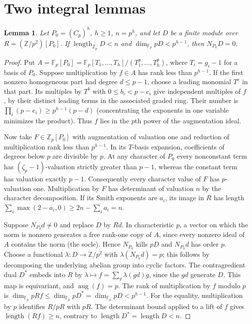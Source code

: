 \documentclass[11pt]{article}
\newtheorem{lemma}[theorem]{Lemma}
\newcommand{\Z}{\mathbb Z}
\newcommand{\F}{\mathbb F}
\newcommand{\aug}{\operatorname{aug}}
\newcommand{\len}{\operatorname{length}}
\begin{document}
\section{Two integral lemmas}
\begin{lemma}\label{lem:norm}
Let $P_0=(C_p)^h$, $h\ge1$, $n=p^h$, and let $D$ be a finite module
over $R=(\Z/p^2)[P_0]$. If
$\len_{\Z_p}D<n$ and $\dim_{\F_p}pD<p^{h-1}$, then $N_{P_0}D=0$.
\end{lemma}
\begin{proof}
Put $A=\F_p[P_0]=\F_p[T_1,\ldots,T_h]/(T_1^p,\ldots,T_h^p)$, where
$T_i=g_i-1$ for a basis of $P_0$. Suppose multiplication by $f\in A$
has rank less than $p^{h-1}$. If the first nonzero homogeneous part
had degree $d\le p-1$, choose a leading monomial $T^e$ in that part.
Its multiples by $T^b$ with $0\le b_i<p-e_i$ give independent multiples
of $f$, by their distinct leading terms in the associated graded ring.
Their number is $\prod_i(p-e_i)\ge p^{h-1}(p-d)$ (concentrating
the exponents in one variable minimizes the product). Thus $f$ lies
in the $p$th power of the augmentation ideal.

Now take $F\in\Z_p[P_0]$ with augmentation of valuation one and
reduction of multiplication rank less than $p^{h-1}$. In its $T$-basis
expansion, coefficients of degrees below $p$ are divisible by $p$.
At any character of $P_0$ every nonconstant term has
$(\zeta_p-1)$-valuation strictly greater than $p-1$, whereas the constant
term has valuation exactly $p-1$. Consequently every character value
of $F$ has $p$-valuation one. Multiplication by $F$ has determinant
of valuation $n$ by the character decomposition. If its Smith
exponents are $a_i$, its image in $R$ has length
$\sum_i\max(2-a_i,0)\ge 2n-\sum_i a_i=n$.

Suppose $N_{P_0}d\ne0$ and replace $D$ by $Rd$. In characteristic $p$,
a vector on which the norm is nonzero generates a free rank-one copy
of $A$, since every nonzero ideal of $A$ contains the norm (the
socle). Hence $N_{P_0}$ kills $pD$ and $N_{P_0}d$ has order $p$.
Choose a functional $\lambda:D\to\Z/p^2$ with
$\lambda(N_{P_0}d)=p$; this follows by decomposing the underlying
abelian group into cyclic factors. The contragredient dual $D^*$
embeds into $R$ by $\lambda\mapsto f=\sum_g\lambda(gd)g$,
since the $gd$ generate $D$. This map is equivariant, and
$\aug(f)=p$. The rank of multiplication by $f$ modulo $p$ is
$\dim_{\F_p}pRf\le\dim_{\F_p}pD^*=\dim_{\F_p}pD<p^{h-1}$.
For the equality, multiplication by $p$ identifies $R/pR$ with $pR$.
The determinant bound applied to a lift of $f$ gives $\len(Rf)\ge n$,
contrary to $\len D^*=\len D<n$.
\end{proof}
\end{document}
